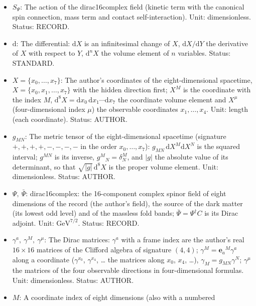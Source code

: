 \documentclass[
  10pt,
]{article}
\providecommand{\tightlist}{%
  \setlength{\itemsep}{0pt}\setlength{\parskip}{0pt}}
\begin{document}
\begin{itemize}
\tightlist
\item
  \(S_\Psi\): The action of the dirac16complex field (kinetic term with
  the canonical spin connection, mass term and contact
  self-interaction). Unit: dimensionless. Status: RECORD.
\item
  \(\mathrm{d}\): The differential: \(\mathrm{d}X\) is an infinitesimal
  change of \(X\), \(\mathrm{d}X/\mathrm{d}Y\) the derivative of \(X\)
  with respect to \(Y\), \(\mathrm{d}^nX\) the volume element of \(n\)
  variables. Status: STANDARD.
\item
  \(X = \{x_0, \dots, x_7\}\): The author's coordinates of the
  eight-dimensional spacetime, \(X = \{x_0, x_1, \dots, x_7\}\) with the
  hidden direction first; \(X^M\) is the coordinate with the index
  \(M\),
  \(\mathrm{d}^8X = \mathrm{d}x_0\,\mathrm{d}x_1\cdots\mathrm{d}x_7\)
  the coordinate volume element and \(X^\mu\) (four-dimensional index
  \(\mu\)) the observable coordinates \(x_1, \dots, x_4\). Unit: length
  (each coordinate). Status: AUTHOR.
\item
  \(g_{MN}\): The metric tensor of the eight-dimensional spacetime
  (signature \(+,+,+,+,-,-,-,-\) in the order \(x_0, \dots, x_7\)):
  \(g_{MN}\,\mathrm{d}X^M\mathrm{d}X^N\) is the squared interval;
  \(g^{MN}\) is its inverse, \(g^M{}_N = \delta^M_N\), and
  \(\lvert g\rvert\) the absolute value of its determinant, so that
  \(\sqrt{\lvert g\rvert}\,\mathrm{d}^8X\) is the proper volume element.
  Unit: dimensionless. Status: AUTHOR.
\item
  \(\Psi,\ \bar\Psi\): dirac16complex: the 16-component complex spinor
  field of eight dimensions of the record (the author's field), the
  source of the dark matter (its lowest odd level) and of the massless
  fold bands; \(\bar\Psi = \Psi^\dagger C\) is its Dirac adjoint. Unit:
  \(\mathrm{GeV}^{7/2}\). Status: RECORD.
\item
  \(\gamma^a,\ \gamma^M,\ \gamma^\mu\): The Dirac matrices: \(\gamma^a\)
  with a frame index are the author's real \(16 \times 16\) matrices of
  the Clifford algebra of signature \((4, 4)\);
  \(\gamma^M = \mathbf{e}_a{}^M\gamma^a\) along a coordinate
  (\(\gamma^{x_0}\), \(\gamma^{x_4}\), \ldots{} the matrices along
  \(x_0\), \(x_4\), \ldots), \(\gamma_M = g_{MN}\gamma^N\);
  \(\gamma^\mu\) the matrices of the four observable directions in
  four-dimensional formulas. Unit: dimensionless. Status: AUTHOR.
\item
  \(M\): A coordinate index of eight dimensions (also with a numbered

\end{itemize}
\end{document}
